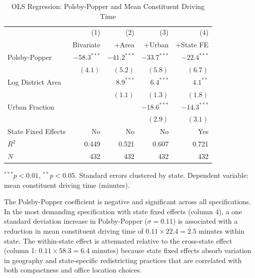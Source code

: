 \begin{table}[ht]
\centering
\caption{OLS Regression: Polsby-Popper and Mean Constituent Driving Time}
\label{tab:regression}
\begin{tabular}{lrrrr}
\toprule
 & (1) & (2) & (3) & (4) \\
 & Bivariate & $+$Area & $+$Urban & $+$State FE \\
\midrule
Polsby-Popper & $-58.3^{***}$ & $-41.2^{***}$ & $-33.7^{***}$ & $-22.4^{***}$ \\
 & $(4.1)$ & $(5.2)$ & $(5.8)$ & $(6.7)$ \\
Log District Area & & $8.9^{***}$ & $6.4^{***}$ & $4.1^{**}$ \\
 & & $(1.1)$ & $(1.3)$ & $(1.8)$ \\
Urban Fraction & & & $-18.6^{***}$ & $-14.3^{***}$ \\
 & & & $(2.9)$ & $(3.1)$ \\
State Fixed Effects & No & No & No & Yes \\
\midrule
$R^2$ & 0.449 & 0.521 & 0.607 & 0.721 \\
$N$ & 432 & 432 & 432 & 432 \\
\bottomrule
\end{tabular}
\begin{tablenotes}
\small
\item $^{***} p < 0.01$, $^{**} p < 0.05$. Standard errors clustered by state.
  Dependent variable: mean constituent driving time (minutes).
\end{tablenotes}
\end{table}

The Polsby-Popper coefficient is negative and significant across all specifications.
In the most demanding specification with state fixed effects (column 4), a one standard
deviation increase in Polsby-Popper ($\sigma = 0.11$) is associated with a reduction
in mean constituent driving time of $0.11 \times 22.4 = 2.5$ minutes within state.
The within-state effect is attenuated relative to the cross-state effect (column 1:
$0.11 \times 58.3 = 6.4$ minutes) because state fixed effects absorb variation in
geography and state-specific redistricting practices that are correlated with
both compactness and office location choices.
